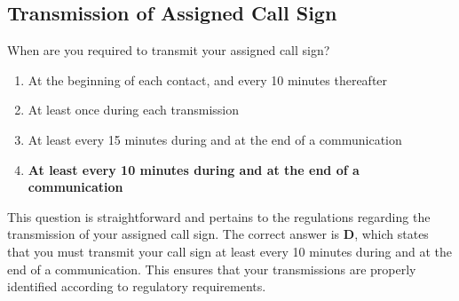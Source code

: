 \subsection{Transmission of Assigned Call Sign}
\label{T1F03}

\begin{tcolorbox}[colback=gray!10!white,colframe=black!75!black,title=T1F03]
When are you required to transmit your assigned call sign?
\begin{enumerate}[label=\Alph*),noitemsep]
    \item At the beginning of each contact, and every 10 minutes thereafter
    \item At least once during each transmission
    \item At least every 15 minutes during and at the end of a communication
    \item \textbf{At least every 10 minutes during and at the end of a communication}
\end{enumerate}
\end{tcolorbox}

This question is straightforward and pertains to the regulations regarding the transmission of your assigned call sign. The correct answer is \textbf{D}, which states that you must transmit your call sign at least every 10 minutes during and at the end of a communication. This ensures that your transmissions are properly identified according to regulatory requirements.